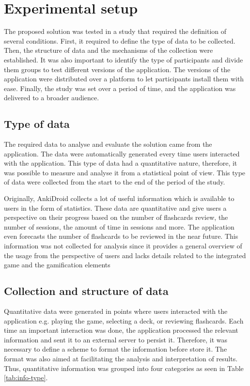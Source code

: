 
\chapter{Experimental setup} %

\label{expe} %


The proposed solution was tested in a study that required the definition of several conditions. First, it required to define the type of data to be collected. Then, the structure of data and the mechanisms of the collection were established. It was also important to identify the type of participants and divide them groups to test different versions of the application. The versions of the application were distributed over a platform to let participants install them with ease. Finally, the study was set over a period of time, and the application was delivered to a broader audience.

\section{Type of data}
The required data to analyse and evaluate the solution came from the application. The data were automatically generated every time users interacted with the application. This type of data had a quantitative nature, therefore, it was possible to measure and analyse it from a statistical point of view. This type of data were collected from the start to the end of the period of the study.

Originally, AnkiDroid collects a lot of useful information which is available to users in the form of statistics. These data are quantitative and give users a perspective on their progress based on the number of flashcards review, the number of sessions, the amount of time in sessions and more. The application even forecasts the number of flashcards to be reviewed in the near future. This information was not collected for analysis since it provides a general overview of the usage from the perspective of users and lacks details related to the integrated game and the gamification elements

\section{Collection and structure of data}
Quantitative data were generated in points where users interacted with the application e.g. playing the game, selecting a deck, or reviewing flashcards. Each time an important interaction was done, the application processed the relevant information and sent it to an external server to persist it. Therefore, it was necessary to define a scheme to format the information before store it. The format was also aimed at facilitating the analysis and interpretation of results. Thus, quantitative information was grouped into four categories as seen in Table \ref{tab:info-type}.

